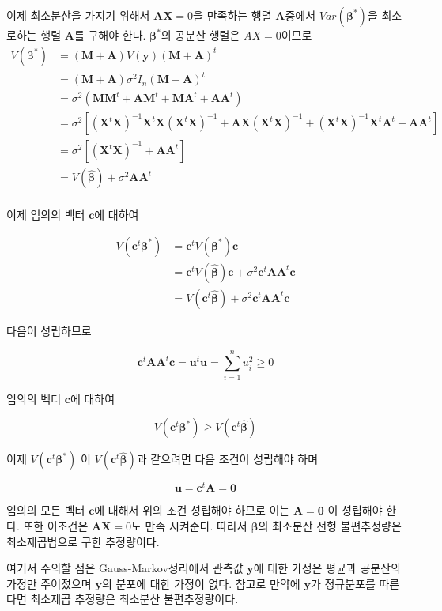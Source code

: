 \documentclass[
]{book}
\theoremstyle{definition}
\theoremstyle{definition}
\theoremstyle{definition}
\theoremstyle{remark}
\begin{document}
이제 최소분산을 가지기 위해서 \(\bm A \bm X=0\)을 만족하는 행렬 \(\bm A\)중에서 \(Var( \bm \beta^*)\)을 최소로하는 행렬 \(\bm A\)를 구해야 한다. \(\bm \beta^*\)의 공분산 행렬은 \(AX=0\)이므로
\begin{align*}
 V( \bm \beta^*) & = ( \bm M+ \bm A)V( \bm y)( \bm M+ \bm A)^t\\
            & = ( \bm M+ \bm A)\sigma^2 I_n( \bm M+ \bm A)^t\\
            & = \sigma^2 ( \bm M \bm M^t+ \bm A \bm M^t+ \bm M  \bm A^t+ \bm A  \bm A^t)\\
            & = \sigma^2 [ ( \bm X^t  \bm X)^{-1}  \bm X^t  \bm X( \bm X^t \bm X)^{-1} + \bm A  \bm X ( \bm X^t  \bm X)^{-1}+( \bm X^t  \bm X)^{-1} \bm X^t  \bm A^t+  \bm A  \bm A^t ]\\
            & = \sigma^2[( \bm X^t  \bm X)^{-1} +  \bm A  \bm A^t ]  \\
            & = V( \hat {\bm \beta} ) + \sigma^2 \bm A \bm A^t\\
\end{align*}

이제 임의의 벡터 \(\bm c\)에 대하여

\begin{align*}
 V( \bm c^t \bm \beta^*)  & = \bm c^t V (\bm \beta^*) \bm c \\
   & =  \bm c^t V( \hat {\bm \beta} ) \bm c + \sigma^2 \bm c^t \bm A \bm A^t \bm c \\
    & =  V( \bm c^t  \hat {\bm \beta} ) + \sigma^2 \bm c^t \bm A \bm A^t \bm c 
\end{align*}

다음이 성립하므로

\[ \bm c^t \bm A \bm A^t \bm c = \bm u^t \bm u = \sum_{i=1}^n u_i^2 \ge 0 \]

임의의 벡터 \(\bm c\)에 대하여

\[ V( \bm c^t \bm \beta^*) \ge  V( \bm c^t  \hat {\bm \beta} ) \]

이제 \(V( \bm c^t \bm \beta^*)\) 이 \(V( \bm c^t \hat {\bm \beta} )\)과 같으려면
다음 조건이 성립해야 하며

\[ \bm u = \bm c^t \bm A = \bm 0 \]

임의의 모든 벡터 \(\bm c\)에 대해서 위의 조건 성립해야 하므로 이는 \(\bm A = \bm 0\) 이 성립해야 한다. 또한 이조건은 \(\bm A \bm X=0\)도 만족 시켜준다. 따라서 \(\bm \beta\)의 최소분산 선형 불편추정량은 최소제곱법으로 구한 추정량이다.

여기서 주의할 점은 Gauss-Markov정리에서 관측값 \(\bm y\)에 대한 가정은 평균과 공분산의 가정만 주어졌으며 \(\bm y\)의 분포에 대한 가정이 없다. 참고로 만약에 \(\bm y\)가 정규분포를 따른다면 최소제곱 추정량은 최소분산 불편추정량이다.
\end{document}
